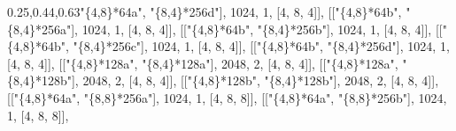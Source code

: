 \documentclass[
  10pt,
  letterpaper,
]{article}
\newenvironment{Shaded}{}{}
\newcommand{\FloatTok}[1]{\textcolor[rgb]{0.25,0.63,0.44}{#1}}
\newcommand{\NormalTok}[1]{#1}
\newcommand{\OperatorTok}[1]{\textcolor[rgb]{0.40,0.40,0.40}{#1}}
\newcommand{\StringTok}[1]{\textcolor[rgb]{0.25,0.44,0.63}{#1}}
\begin{document}
\begin{Shaded}
\begin{Highlighting}[]
\NormalTok{[[}\StringTok{"\{4,8\}*64a"}\OperatorTok{,} \StringTok{"\{8,4\}*256d"}\NormalTok{]}\OperatorTok{,} \FloatTok{1024}\OperatorTok{,} \FloatTok{1}\OperatorTok{,}\NormalTok{ [}\FloatTok{4}\OperatorTok{,} \FloatTok{8}\OperatorTok{,} \FloatTok{4}\NormalTok{]]}\OperatorTok{,}
\NormalTok{[[}\StringTok{"\{4,8\}*64b"}\OperatorTok{,} \StringTok{"\{8,4\}*256a"}\NormalTok{]}\OperatorTok{,} \FloatTok{1024}\OperatorTok{,} \FloatTok{1}\OperatorTok{,}\NormalTok{ [}\FloatTok{4}\OperatorTok{,} \FloatTok{8}\OperatorTok{,} \FloatTok{4}\NormalTok{]]}\OperatorTok{,}
\NormalTok{[[}\StringTok{"\{4,8\}*64b"}\OperatorTok{,} \StringTok{"\{8,4\}*256b"}\NormalTok{]}\OperatorTok{,} \FloatTok{1024}\OperatorTok{,} \FloatTok{1}\OperatorTok{,}\NormalTok{ [}\FloatTok{4}\OperatorTok{,} \FloatTok{8}\OperatorTok{,} \FloatTok{4}\NormalTok{]]}\OperatorTok{,}
\NormalTok{[[}\StringTok{"\{4,8\}*64b"}\OperatorTok{,} \StringTok{"\{8,4\}*256c"}\NormalTok{]}\OperatorTok{,} \FloatTok{1024}\OperatorTok{,} \FloatTok{1}\OperatorTok{,}\NormalTok{ [}\FloatTok{4}\OperatorTok{,} \FloatTok{8}\OperatorTok{,} \FloatTok{4}\NormalTok{]]}\OperatorTok{,}
\NormalTok{[[}\StringTok{"\{4,8\}*64b"}\OperatorTok{,} \StringTok{"\{8,4\}*256d"}\NormalTok{]}\OperatorTok{,} \FloatTok{1024}\OperatorTok{,} \FloatTok{1}\OperatorTok{,}\NormalTok{ [}\FloatTok{4}\OperatorTok{,} \FloatTok{8}\OperatorTok{,} \FloatTok{4}\NormalTok{]]}\OperatorTok{,}
\NormalTok{[[}\StringTok{"\{4,8\}*128a"}\OperatorTok{,} \StringTok{"\{8,4\}*128a"}\NormalTok{]}\OperatorTok{,} \FloatTok{2048}\OperatorTok{,} \FloatTok{2}\OperatorTok{,}\NormalTok{ [}\FloatTok{4}\OperatorTok{,} \FloatTok{8}\OperatorTok{,} \FloatTok{4}\NormalTok{]]}\OperatorTok{,}
\NormalTok{[[}\StringTok{"\{4,8\}*128a"}\OperatorTok{,} \StringTok{"\{8,4\}*128b"}\NormalTok{]}\OperatorTok{,} \FloatTok{2048}\OperatorTok{,} \FloatTok{2}\OperatorTok{,}\NormalTok{ [}\FloatTok{4}\OperatorTok{,} \FloatTok{8}\OperatorTok{,} \FloatTok{4}\NormalTok{]]}\OperatorTok{,}
\NormalTok{[[}\StringTok{"\{4,8\}*128b"}\OperatorTok{,} \StringTok{"\{8,4\}*128b"}\NormalTok{]}\OperatorTok{,} \FloatTok{2048}\OperatorTok{,} \FloatTok{2}\OperatorTok{,}\NormalTok{ [}\FloatTok{4}\OperatorTok{,} \FloatTok{8}\OperatorTok{,} \FloatTok{4}\NormalTok{]]}\OperatorTok{,}
\NormalTok{[[}\StringTok{"\{4,8\}*64a"}\OperatorTok{,} \StringTok{"\{8,8\}*256a"}\NormalTok{]}\OperatorTok{,} \FloatTok{1024}\OperatorTok{,} \FloatTok{1}\OperatorTok{,}\NormalTok{ [}\FloatTok{4}\OperatorTok{,} \FloatTok{8}\OperatorTok{,} \FloatTok{8}\NormalTok{]]}\OperatorTok{,}
\NormalTok{[[}\StringTok{"\{4,8\}*64a"}\OperatorTok{,} \StringTok{"\{8,8\}*256b"}\NormalTok{]}\OperatorTok{,} \FloatTok{1024}\OperatorTok{,} \FloatTok{1}\OperatorTok{,}\NormalTok{ [}\FloatTok{4}\OperatorTok{,} \FloatTok{8}\OperatorTok{,} \FloatTok{8}\NormalTok{]]}\OperatorTok{,}

\end{Highlighting}
\end{Shaded}
\end{document}
